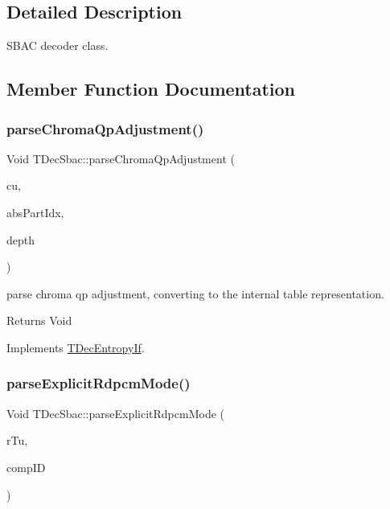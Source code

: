 \subsection{Detailed Description}
S\+B\+AC decoder class. 

\subsection{Member Function Documentation}
\mbox{\label{class_t_dec_sbac_ab4b66a3f1f2268f1d99c7c9bf7624138}} 
\subsubsection{\texorpdfstring{parse\+Chroma\+Qp\+Adjustment()}{parseChromaQpAdjustment()}}
{\footnotesize\ttfamily Void T\+Dec\+Sbac\+::parse\+Chroma\+Qp\+Adjustment (\begin{DoxyParamCaption}\item[{\hyperlink{class_t_com_data_c_u}{T\+Com\+Data\+CU} $\ast$}]{cu,  }\item[{U\+Int}]{abs\+Part\+Idx,  }\item[{U\+Int}]{depth }\end{DoxyParamCaption})\hspace{0.3cm}{\ttfamily [virtual]}}

parse chroma qp adjustment, converting to the internal table representation. \begin{DoxyReturn}{Returns}
Void 
\end{DoxyReturn}


Implements \hyperlink{class_t_dec_entropy_if}{T\+Dec\+Entropy\+If}.

\mbox{\label{class_t_dec_sbac_ad50dc61f59c8fd801b3939a2ffa14995}} 
\subsubsection{\texorpdfstring{parse\+Explicit\+Rdpcm\+Mode()}{parseExplicitRdpcmMode()}}
{\footnotesize\ttfamily Void T\+Dec\+Sbac\+::parse\+Explicit\+Rdpcm\+Mode (\begin{DoxyParamCaption}\item[{\hyperlink{class_t_com_t_u}{T\+Com\+TU} \&}]{r\+Tu,  }\item[{Component\+ID}]{comp\+ID }\end{DoxyParamCaption})\hspace{0.3cm}{\ttfamily [virtual]}}

